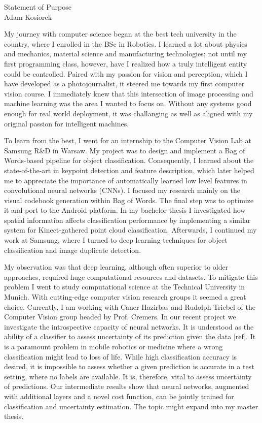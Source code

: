 \documentclass[12pt]{article}
\begin{document}
\begin{center}
{\Large Statement of Purpose} \\[.3in]
{\large Adam Kosiorek}
\end{center}

\vspace*{.5in}

My journey with computer science began at the best tech university in the country, where I enrolled in the BSc in Robotics. I learned a lot about physics and mechanics, material science and manufacturing technologies; not until my first programming class, however, have I realized how a truly intelligent entity could be controlled. Paired with my passion for vision and perception, which I have developed as a photojournalist, it steered me towards my first computer vision course. I immediately knew that this intersection of image processing and machine learning was the area I wanted to focus on. Without any systems good enough for real world deployment, it was challanging as well as aligned with my original passion for intelligent machines.

To learn from the best, I went for an internship to the Computer Vision Lab at Samsung R\&D in Warsaw. My project was to design and implement a Bag of Words-based pipeline for object classification. Consequently, I learned about the state-of-the-art in keypoint detection and feature description, which later helped me to appreciate the importance of automatically learned low level features in convolutional neural networks (CNNs). I focused my research mainly on the visual codebook generation within Bag of Words. The final step was to optimize it and port to the Android platform. In my bachelor thesis I investigated how spatial information affects classification performance by implementing a similar system for Kinect-gathered point cloud classification. Afterwards, I continued my work at Samsung, where I turned to deep learning techniques for object classification and image duplicate detection.

My observation was that deep learning, although often superior to older approaches, required huge computational resources and datasets. To mitigate this problem I went to study computational science at the Technical University in Munich. With cutting-edge computer vision research groups it seemed a great choice. Currently, I am working with Caner Hazirbas and Rudolph Triebel of the Computer Vision group headed by Prof. Cremers. In our recent project we investigate the introspective capacity of neural networks. It is understood as the ability of a classifier to assess uncertainty of its prediction given the data [ref]. It is a paramount problem in mobile robotics or medicine where a wrong classification might lead to loss of life. While high classification accuracy is desired, it is impossible to assess whether a given prediction is accurate in a test setting, where no labels are available. It is, therefore, vital to assess uncertainty of predictions. Our intermediate results show that neural networks, augmented with additional layers and a novel cost function, can be jointly trained for classification and uncertainty estimation. The topic might expand into my master thesis.
\end{document}
